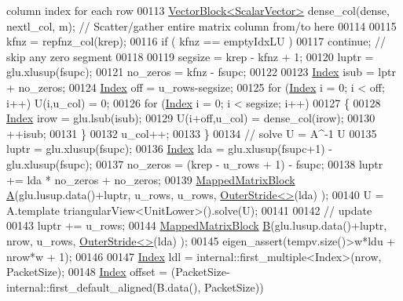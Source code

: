 \begin{DoxyCode}
{       column index for each row}
00113         \hyperlink{group___core___module_class_eigen_1_1_vector_block}{VectorBlock<ScalarVector>} dense\_col(dense, nextl\_col, m); \textcolor{comment}{//
       Scatter/gather entire matrix column from/to here}
00114         
00115         kfnz = repfnz\_col(krep); 
00116         \textcolor{keywordflow}{if} ( kfnz == emptyIdxLU ) 
00117           \textcolor{keywordflow}{continue}; \textcolor{comment}{// skip any zero segment}
00118         
00119         segsize = krep - kfnz + 1;
00120         luptr = glu.xlusup(fsupc);    
00121         no\_zeros = kfnz - fsupc; 
00122         
00123         \hyperlink{namespace_eigen_a62e77e0933482dafde8fe197d9a2cfde}{Index} isub = lptr + no\_zeros;
00124         \hyperlink{namespace_eigen_a62e77e0933482dafde8fe197d9a2cfde}{Index} off = u\_rows-segsize;
00125         \textcolor{keywordflow}{for} (\hyperlink{namespace_eigen_a62e77e0933482dafde8fe197d9a2cfde}{Index} i = 0; i < off; i++) U(i,u\_col) = 0;
00126         \textcolor{keywordflow}{for} (\hyperlink{namespace_eigen_a62e77e0933482dafde8fe197d9a2cfde}{Index} i = 0; i < segsize; i++)
00127         \{
00128           \hyperlink{namespace_eigen_a62e77e0933482dafde8fe197d9a2cfde}{Index} irow = glu.lsub(isub); 
00129           U(i+off,u\_col) = dense\_col(irow); 
00130           ++isub; 
00131         \}
00132         u\_col++;
00133       \}
00134       \textcolor{comment}{// solve U = A^-1 U}
00135       luptr = glu.xlusup(fsupc);
00136       \hyperlink{namespace_eigen_a62e77e0933482dafde8fe197d9a2cfde}{Index} lda = glu.xlusup(fsupc+1) - glu.xlusup(fsupc);
00137       no\_zeros = (krep - u\_rows + 1) - fsupc;
00138       luptr += lda * no\_zeros + no\_zeros;
00139       \hyperlink{group___core___module_class_eigen_1_1_map}{MappedMatrixBlock} \hyperlink{group___core___module_class_eigen_1_1_matrix}{A}(glu.lusup.data()+luptr, u\_rows, u\_rows, 
      \hyperlink{class_eigen_1_1_outer_stride}{OuterStride<>}(lda) );
00140       U = A.template triangularView<UnitLower>().solve(U);
00141       
00142       \textcolor{comment}{// update}
00143       luptr += u\_rows;
00144       \hyperlink{group___core___module_class_eigen_1_1_map}{MappedMatrixBlock} \hyperlink{group___core___module_class_eigen_1_1_matrix}{B}(glu.lusup.data()+luptr, nrow, u\_rows, 
      \hyperlink{class_eigen_1_1_outer_stride}{OuterStride<>}(lda) );
00145       eigen\_assert(tempv.size()>w*ldu + nrow*w + 1);
00146       
00147       \hyperlink{namespace_eigen_a62e77e0933482dafde8fe197d9a2cfde}{Index} ldl = internal::first\_multiple<Index>(nrow, PacketSize);
00148       \hyperlink{namespace_eigen_a62e77e0933482dafde8fe197d9a2cfde}{Index} offset = (PacketSize-internal::first\_default\_aligned(B.data(), PacketSize)) %

\end{DoxyCode}
